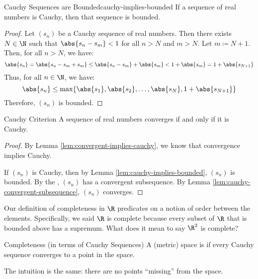 \begin{lembox}{Cauchy Sequences are Bounded}{cauchy-implies-bounded}
    If a sequence of real numbers is Cauchy, then that sequence is bounded.
    \tcblower
    \begin{proof}
        Let $(s_n)$ be a Cauchy sequence of real numbers. Then there exists $N \in \N$ such that $\abs{s_n - s_m} < 1$ for all $n > N$ and $m > N$. Let $m \coloneq N+1$. Then, for all $n > N$, we have:
        \[ \abs{s_n} = \abs{s_n - s_m + s_m} \leq \abs{s_n - s_m} + \abs{s_m} < 1 + \abs{s_m} = 1 + \abs{s_{N+1}} \]
        Thus, for all $n \in \N$, we have:
        \[ \abs{s_n} \leq \max\{\abs{s_1}, \abs{s_2}, \ldots, \abs{s_N}, 1 + \abs{s_{N+1}} \} \]
        Therefore, $(s_n)$ is bounded.
    \end{proof}
\end{lembox}

\begin{thmbox}{Cauchy Criterion}{}
    A sequence of real numbers converges if and only if it is Cauchy.
    \tcblower
    \begin{proof}
        By Lemma \ref{lem:convergent-implies-cauchy}, we know that convergence implies Cauchy.

        If $(s_n)$ is Cauchy, then by Lemma \ref{lem:cauchy-implies-bounded}, $(s_n)$ is bounded. By the , $(s_n)$ has a convergent subsequence. By Lemma \ref{lem:cauchy-convergent-subsequence}, $(s_n)$ converges.
    \end{proof}
\end{thmbox}

Our definition of completeness in $\R$ predicates on a notion of order between the elements. Specifically, we said $\R$ is complete because every subset of $\R$ that is bounded above has a supremum. What does it mean to say $\R^2$ is complete?

\begin{dfnbox}{Completeness (in terms of Cauchy Sequences)}{}
    A (metric) space is  if every Cauchy sequence converges to a point in the space.
\end{dfnbox}

The intuition is the same: there are no points ``missing'' from the space.
